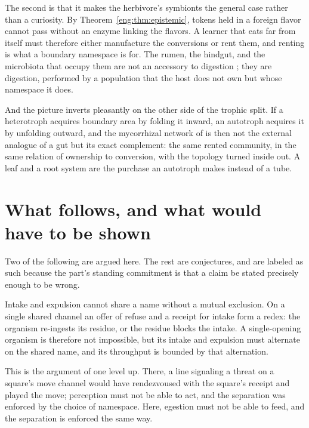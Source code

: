 The second is that it makes the herbivore's symbionts the general case rather
than a curiosity. By Theorem~\ref{eng:thm:epistemic}, tokens held in a foreign
flavor cannot pass without an enzyme linking the flavors. A learner that eats far
from itself must therefore either manufacture the conversions or rent them, and
renting is what a boundary namespace is for. The rumen, the hindgut, and the
microbiota that occupy them are not an accessory to digestion
\cite{karasov2013}; they are digestion, performed by a population that the host
does not own but whose namespace it does.

And the picture inverts pleasantly on the other side of the trophic split. If a
heterotroph acquires boundary area by folding it inward, an autotroph acquires it
by unfolding outward, and the mycorrhizal network of \chEng is then not the
external analogue of a gut but its exact complement: the same rented community,
in the same relation of ownership to conversion, with the topology turned inside
out. A leaf and a root system are the purchase an autotroph makes instead of a
tube.

\section{What follows, and what would have to be shown}
\label{tub:sec:props}

Two of the following are argued here. The rest are conjectures, and are labeled
as such because the part's standing commitment is that a claim be stated
precisely enough to be wrong.

\begin{proposition}
\label{tub:prop:twoends}
Intake and expulsion cannot share a name without a mutual exclusion. On a single
shared channel an offer of refuse and a receipt for intake form a redex: the
organism re-ingests its residue, or the residue blocks the intake. A
single-opening organism is therefore not impossible, but its intake and
expulsion must alternate on the shared name, and its throughput is bounded by
that alternation.
\end{proposition}

This is the argument of \chGame one level up. There, a line signaling a threat on
a square's move channel would have rendezvoused with the square's receipt and
played the move; perception must not be able to act, and the separation was
enforced by the choice of namespace. Here, egestion must not be able to feed, and
the separation is enforced the same way.

